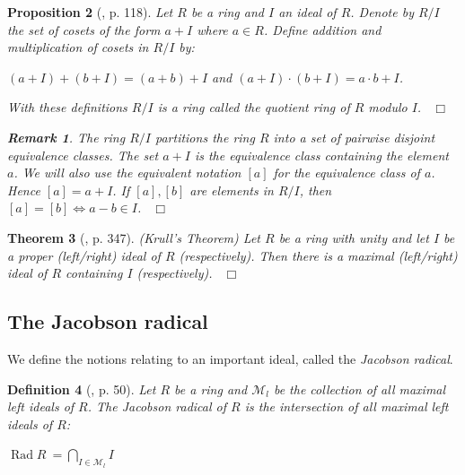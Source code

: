 \documentclass[12pt, oneside]{book}
\newtheorem{theorem}{Theorem}[subsection]
\newtheorem{proposition}[theorem]{Proposition}
\newtheorem{definition}[theorem]{Definition}
\newtheorem{remark}[theorem]{Remark}
\newcommand{\qed}{\hfill ~$\Box$\\}
\def\Rad{\operatorname{Rad}}
\begin{document}
\begin{proposition}[\cite{G1}, p. 118] \label{QuotientRings}
\normalfont
\noindent Let $R$ be a ring and $I$ an ideal of $R$. Denote by $R / I$ the set of {\sl cosets} 
of the form $a+I$ where $a \in R$. Define addition and multiplication of cosets in $R / I$  by: 
\begin{center}
$(a+I)+(b+I)=(a+b)+I$ \qquad and \qquad $(a+I) \cdot (b+I)=a \cdot b + I$.
\end{center}

\noindent With these definitions $R / I$ is a ring called the {\sl quotient ring} of 
$R$ modulo $I$. 
\qed
\begin{remark}
\normalfont
The ring $R / I$ partitions the ring $R$ into a set of pairwise disjoint equivalence classes. 
The set $a + I$ is the equivalence class containing the element $a$. We will also use 
the equivalent notation $[a]$ for the equivalence class of $a$. Hence $[a] = a + I$. 
If $[a], [b]$ are elements in $R / I$, then $[a] = [b] \iff a - b \in I$.
\qed
\end{remark}

\end{proposition}

\begin{theorem}[\cite{R1}, p. 347] \label{Krull} \textup{(Krull's Theorem)} \textup{Let $R$ be a ring with unity and let $I$ be a proper (left/right) ideal of $R$ (respectively). Then there is a maximal (left/right) ideal of $R$ containing $I$ (respectively).} \qed

\end{theorem}


\subsection{The Jacobson radical}

We define the notions relating to an important ideal, called the {\sl Jacobson radical}. 

\begin{definition}[\cite{L1}, p. 50] 
\normalfont
Let $R$ be a ring and $\mathcal{M}_l$ be the collection of all maximal left ideals of $R$. 
The {\sl Jacobson radical} of $R$ is the intersection of all maximal left ideals of $R$: 
\begin{center}
$ \Rad R\ = \underset{I \in \mathcal{M}_l}{\bigcap} I$
\end{center}
\end{definition}
\end{document}
